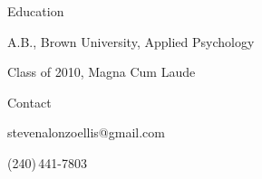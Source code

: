 \documentclass[12pt]{res}
\begin{document}
{\begin{resume}
\begin{minipage}{7.6in}
\begin{list}{}{\leftmargin=0em}
\item{Education\dotfill 
\begin{list}{-}{\leftmargin=1em}
\item A.B., Brown University, Applied Psychology
\item Class of 2010, Magna Cum Laude
\end{list}}

\item{Contact\dotfill 
\begin{list}{-}{\leftmargin=1em}
\item stevenalonzoellis@gmail.com
\item (240)\,441-7803
\end{list}}
\end{list}
\vspace{27mm}
\vspace{17mm}
\end{minipage}
\end{resume}
} %
\end{document}
